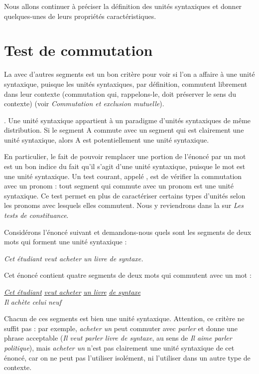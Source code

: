 Nous allons continuer à préciser la définition des unités syntaxiques et donner quelques-unes de leurs propriétés caractéristiques.

\section{Test de commutation}\label{sec:3.2.10}

La  avec d’autres segments est un bon critère pour voir si l’on a affaire à une unité syntaxique, puisque les unités syntaxiques, par définition, commutent librement dans leur contexte (commutation qui, rappelons-le, doit préserver le sens du contexte) (voir  \textit{Commutation et exclusion mutuelle}).

{. Une unité syntaxique appartient à un paradigme d’unités syntaxiques de même distribution. Si le segment A commute avec un segment qui est clairement une unité syntaxique, alors A est potentiellement une unité syntaxique.}

En particulier, le fait de pouvoir remplacer une portion de l’énoncé par un mot est un bon indice du fait qu’il s’agit d’une unité syntaxique, puisque le mot est une unité syntaxique. Un test courant, appelé , est de vérifier la commutation avec un pronom : tout segment qui commute avec un pronom est une unité syntaxique. Ce test permet en plus de caractériser certains types d’unités selon les pronoms avec lesquels elles commutent. Nous y reviendrons dans la  sur \textit{Les tests de constituance}.

Considérons l’énoncé suivant et demandons-nous quels sont les segments de deux mots qui forment une unité syntaxique :

\ea\label{ex:livredesyntaxe}
    \textit{Cet étudiant veut acheter un livre de syntaxe.}
\z

Cet énoncé contient quatre segments de deux mots qui commutent avec un mot :

\ea\label{ex:3:2:9:star}\relax
{\let\eachwordone\normalfont
\gll \uline{\textit{Cet étudiant}}  \uline{\textit{veut acheter}}  \uline{\textit{un livre}}  \uline{\textit{de syntaxe}}\\
     \textit{Il}  \textit{achète}  \textit{celui}  \textit{neuf}\\}
\z

Chacun de ces segments est bien une unité syntaxique. Attention, ce critère ne suffit pas : par exemple, \textit{acheter un} peut commuter avec \textit{parler} et donne une phrase acceptable (\textit{Il veut parler livre de syntaxe}, au sens de \textit{Il aime parler politique}), mais \textit{acheter un} n’est pas clairement une unité syntaxique de cet énoncé, car on ne peut pas l’utiliser isolément, ni l’utiliser dans un autre type de contexte.

